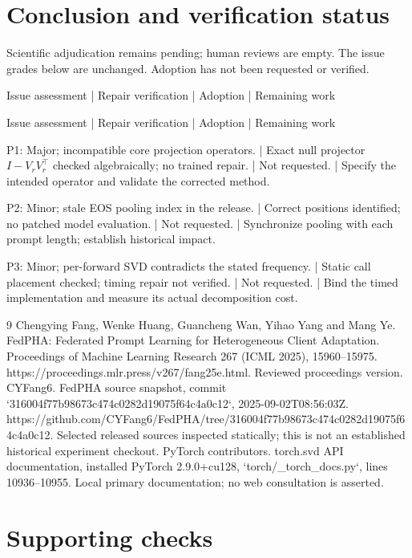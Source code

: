 \documentclass[10pt]{article}
\begin{document}
\section*{Conclusion and verification status}
Scientific adjudication remains pending; human reviews are empty. The issue grades below are unchanged. Adoption has not been requested or verified.\par
Issue assessment | Repair verification | Adoption | Remaining work\par
Issue assessment | Repair verification | Adoption | Remaining work\par
P1: Major; incompatible core projection operators. | Exact null projector \(I-V_rV_r^\top\) checked algebraically; no trained repair. | Not requested. | Specify the intended operator and validate the corrected method.\par
P2: Minor; stale EOS pooling index in the release. | Correct positions identified; no patched model evaluation. | Not requested. | Synchronize pooling with each prompt length; establish historical impact.\par
P3: Minor; per-forward SVD contradicts the stated frequency. | Static call placement checked; timing repair not verified. | Not requested. | Bind the timed implementation and measure its actual decomposition cost.\par
9 Chengying Fang, Wenke Huang, Guancheng Wan, Yihao Yang and Mang Ye. FedPHA: Federated Prompt Learning for Heterogeneous Client Adaptation. Proceedings of Machine Learning Research 267 (ICML 2025), 15960–15975. https://proceedings.mlr.press/v267/fang25e.html. Reviewed proceedings version. CYFang6. FedPHA source snapshot, commit `316004f77b98673c474c0282d19075f64c4a0c12`, 2025-09-02T08:56:03Z. https://github.com/CYFang6/FedPHA/tree/316004f77b98673c474c0282d19075f64c4a0c12. Selected released sources inspected statically; this is not an established historical experiment checkout. PyTorch contributors. torch.svd API documentation, installed PyTorch 2.9.0+cu128, `torch/\_torch\_docs.py`, lines 10936–10955. Local primary documentation; no web consultation is asserted.\par
\section*{Supporting checks}
\end{document}
